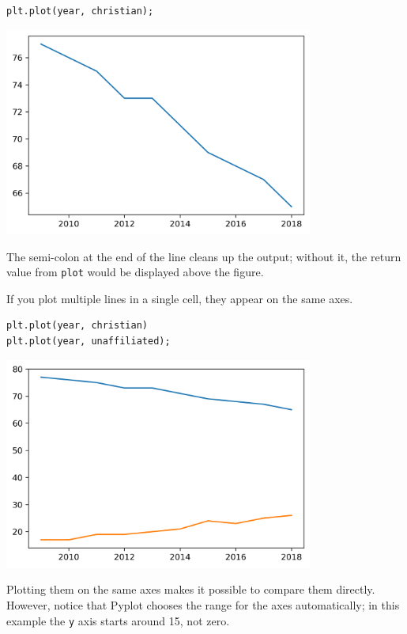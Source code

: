 \begin{lstlisting}[]
plt.plot(year, christian);
\end{lstlisting}

\begin{center}
\includegraphics[width=4in]{06_plotting_files/06_plotting_24_0.png}
\end{center}

The semi-colon at the end of the line cleans up the output; without it,
the return value from \passthrough{\lstinline!plot!} would be displayed
above the figure.

If you plot multiple lines in a single cell, they appear on the same
axes.

\begin{lstlisting}[]
plt.plot(year, christian)
plt.plot(year, unaffiliated);
\end{lstlisting}

\begin{center}
\includegraphics[width=4in]{06_plotting_files/06_plotting_26_0.png}
\end{center}

Plotting them on the same axes makes it possible to compare them
directly. However, notice that Pyplot chooses the range for the axes
automatically; in this example the \passthrough{\lstinline!y!} axis
starts around 15, not zero.

